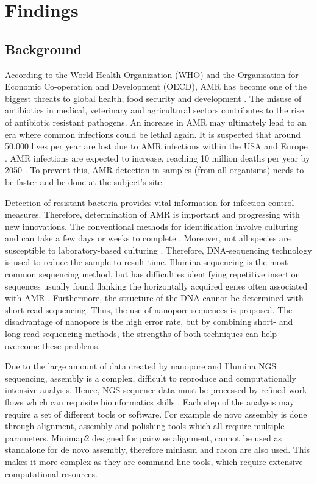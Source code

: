 \documentclass[a4paper,num-refs]{oup-contemporary}
\begin{document}
\section{Findings}
\subsection{Background}
According to the World Health Organization (WHO) and the Organisation for Economic Co-operation and Development (OECD), AMR has become one of the biggest threats to global health, food security and development \cite{OrganisationforEconomicCo-operationandDevelopment2017, WorldHealthOrganization2018}. The misuse of antibiotics in medical, veterinary and agricultural sectors contributes to the rise of antibiotic resistant pathogens. An increase in AMR may ultimately lead to an era where common infections could be lethal again. It is suspected that around 50.000 lives per year are lost due to AMR infections within the USA and Europe \cite{Simlai2016}. AMR infections are expected to increase, reaching 10 million deaths per year by 2050 \cite{ONeil2014}. To prevent this, AMR detection in samples (from all organisms) needs to be faster and be done at the subject's site. 

Detection of resistant bacteria provides vital information for infection control measures. Therefore, determination of AMR is important and progressing with new innovations. The conventional methods for identification involve culturing and can take a few days or weeks to complete \cite{Quick2015}. Moreover, not all species are susceptible to laboratory-based culturing \cite{Mitsuhashi2017}. Therefore, DNA-sequencing technology is used to reduce the sample-to-result time. Illumina sequencing is the most common sequencing method, but has difficulties identifying repetitive insertion sequences usually found flanking the horizontally acquired genes often associated with AMR \cite{Ashton2014}. Furthermore, the structure of the DNA cannot be determined with short-read sequencing. Thus, the use of nanopore sequences is proposed. The disadvantage of nanopore is the high error rate, but by combining short- and long-read sequencing methods, the strengths of both techniques can help overcome these problems.

Due to the large amount of data created by nanopore and Illumina NGS sequencing, assembly is a complex, difficult to reproduce and computationally intensive analysis. Hence, NGS sequence data must be processed by refined work-flows which can requisite bioinformatics skills \cite{Hemlata2016}. Each step of the analysis may require a set of different tools or software. For example de novo assembly is done through alignment, assembly and polishing tools which all require multiple parameters. Minimap2 designed for pairwise alignment, cannot be used as standalone for de novo assembly, therefore miniasm and racon are also used. This makes it more complex as they are command-line tools, which require extensive computational resources. 
\end{document}
